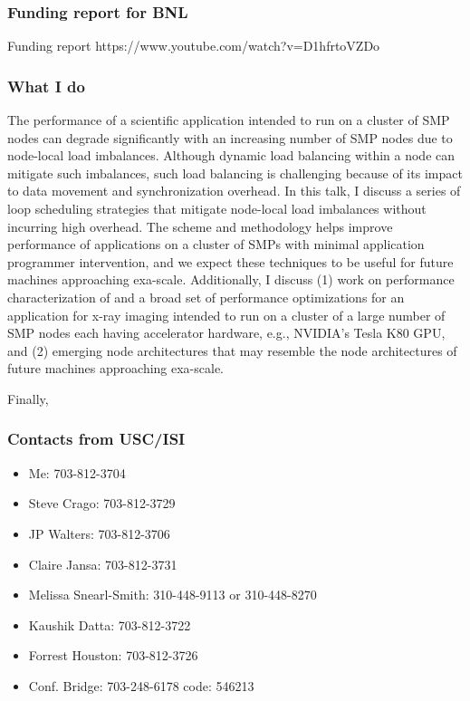\begin{frame}[label=] 
\frametitle{Funding report for BNL} 
Funding report
https://www.youtube.com/watch?v=D1hfrtoVZDo
\end{frame} 

\begin{frame}[label=myProfile] 
\frametitle{What I do} 


The performance of a scientific application intended to run on a cluster of SMP
nodes can degrade significantly with an increasing number of SMP nodes
due to node-local load imbalances. Although dynamic load balancing
within a node can mitigate such imbalances, such load balancing is
challenging because of its impact to data movement and synchronization
overhead. In this talk, I discuss a series of loop scheduling
strategies that mitigate node-local load imbalances without 
incurring high overhead. The scheme and methodology helps improve
performance of applications on a cluster of SMPs with minimal
application programmer intervention, and we expect these techniques to
be useful for future machines approaching exa-scale. 
Additionally, I discuss (1) work on performance
characterization of and a broad set of
performance optimizations for an application for x-ray imaging
intended to run on a cluster of a large number of SMP nodes each
having accelerator hardware, e.g., NVIDIA's Tesla K80 GPU, 
and (2) emerging node architectures that may resemble the
node architectures of future machines approaching exa-scale.

Finally, 


\end{frame}


\begin{frame}[label=contactswork]
\frametitle{Contacts from USC/ISI}
\begin{itemize}
\small \item \small Me: 703-812-3704
\item \small Steve Crago: 703-812-3729
\item \small JP Walters: 703-812-3706
\item \small Claire Jansa: 703-812-3731
\item \small Melissa Snearl-Smith: 310-448-9113 or 310-448-8270 
\item \small Kaushik Datta: 703-812-3722
\item \small Forrest Houston: 703-812-3726
\item \small Conf. Bridge: 703-248-6178 code: 546213 
\end{itemize}
\end{frame}


